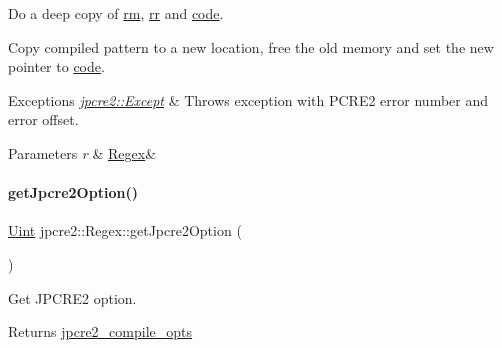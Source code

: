 Do a deep copy of \hyperlink{classjpcre2_1_1Regex_a447925705d222dbbd8c7d60b98cc65f0}{rm}, \hyperlink{classjpcre2_1_1Regex_a5a7ac6c6288988079b8933b4b6637fab}{rr} and \hyperlink{classjpcre2_1_1Regex_a2742264206d8976c413b474b7bac4b2e}{code}. 

Copy compiled pattern to a new location, free the old memory and set the new pointer to \hyperlink{classjpcre2_1_1Regex_a2742264206d8976c413b474b7bac4b2e}{code}.


\begin{DoxyExceptions}{Exceptions}
{\em \hyperlink{classjpcre2_1_1Except}{jpcre2\+::\+Except}} & Throws exception with P\+C\+R\+E2 error number and error offset. \\
\hline
\end{DoxyExceptions}

\begin{DoxyParams}{Parameters}
{\em r} & \hyperlink{classjpcre2_1_1Regex}{Regex}\& \\
\hline
\end{DoxyParams}
\hypertarget{classjpcre2_1_1Regex_a5d2d04eb7c393338a4c8cce941e957ef_a5d2d04eb7c393338a4c8cce941e957ef}{}\label{classjpcre2_1_1Regex_a5d2d04eb7c393338a4c8cce941e957ef_a5d2d04eb7c393338a4c8cce941e957ef} 
\paragraph{\texorpdfstring{get\+Jpcre2\+Option()}{getJpcre2Option()}}
{\footnotesize\ttfamily \hyperlink{namespacejpcre2_a078242d38221a13fb3543b9edd78c099}{Uint} jpcre2\+::\+Regex\+::get\+Jpcre2\+Option (\begin{DoxyParamCaption}{ }\end{DoxyParamCaption})\hspace{0.3cm}{\ttfamily [inline]}}



Get J\+P\+C\+R\+E2 option. 

\begin{DoxyReturn}{Returns}
\hyperlink{classjpcre2_1_1Regex_abdd26c3bc1c3132f0aa73dde1690a7ef}{jpcre2\+\_\+compile\+\_\+opts} 
\end{DoxyReturn}
\hypertarget{classjpcre2_1_1Regex_ae9afaf627ed922a9e4cee8074d30edfa_ae9afaf627ed922a9e4cee8074d30edfa}{}\label{classjpcre2_1_1Regex_ae9afaf627ed922a9e4cee8074d30edfa_ae9afaf627ed922a9e4cee8074d30edfa} 
